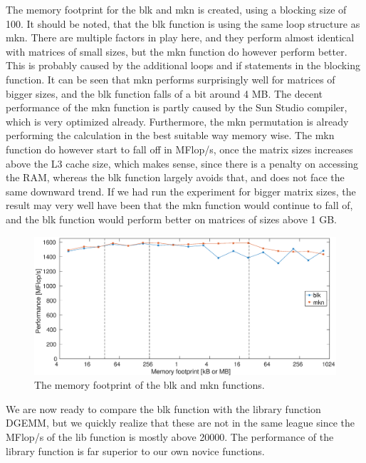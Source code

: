 The memory footprint for the blk and mkn is created, using a blocking size of 100. It should be noted, that the blk function is using the same loop structure as mkn. There are multiple factors in play here, and they perform almost identical with matrices of small sizes, but the mkn function do however perform better. This is probably caused by the additional loops and if statements in the blocking function. It can be seen that mkn performs surprisingly well for matrices of bigger sizes, and the blk function falls of a bit around 4 MB. The decent performance of the mkn function is partly caused by the Sun Studio compiler, which is very optimized already. Furthermore, the mkn permutation is already performing the calculation in the best suitable way memory wise. The mkn function do however start to fall off in MFlop/s, once the matrix sizes increases above the L3 cache size, which makes sense, since there is a penalty on accessing the RAM, whereas the blk function largely avoids that, and does not face the same downward trend. If we had run the experiment for bigger matrix sizes, the result may very well have been that the mkn function would continue to fall of, and the blk function would perform better on matrices of sizes above 1 GB.

\begin{figure}[h!] 
	\begin{center}
		\includegraphics[width=1.1 \textwidth]{fig/permGraph_blk_mkn.eps} 
		\caption{The memory footprint of the blk and mkn functions.}
		\label{fig:mknblk}
	\end{center}
\end{figure}


We are now ready to compare the blk function with the library function DGEMM, but we quickly realize that these are not in the same league since the MFlop/s of the lib function is mostly above 20000. The performance of the library function is far superior to our own novice functions.